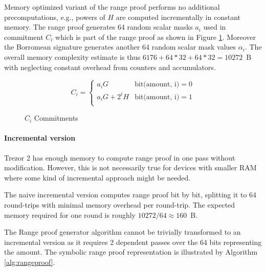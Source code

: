 \documentclass[]{article}
\begin{document}
Memory optimized variant of the range proof performs no additional precomputations, e.g., powers of $H$ are computed incrementally in constant memory. The range proof generates 64 random scalar masks $a_i$ used in commitment $C_i$ which is part of the range proof as shown in Figure \ref{eq:ci}. Moreover the Borromean signature generates another 64 random scalar mask values $\alpha_i$. The overall memory complexity estimate is thus $6176 + 64*32 + 64*32 = 10272$~B with neglecting constant overhead from counters and accumulators.  

\begin{figure}[H]
\begin{equation}
C_i = 
\begin{cases} 
a_iG & \text{bit(amount, i)} = 0 \\
a_iG + 2^iH & \text{bit(amount, i)} = 1 \\
\end{cases}
\end{equation}
\caption{$C_i$ Commitments} \label{eq:ci}
\end{figure}

\paragraph{Incremental version}
Trezor 2 has enough memory to compute range proof in one pass without modification. However, this is not necessarily true for devices with smaller RAM where some kind of incremental approach might be needed.

The naive incremental version computes range proof bit by bit, splitting it to 64 round-trips with minimal memory overhead per round-trip. The expected memory required for one round is roughly $10272 / 64 \approx 160$~B.

The Range proof generator algorithm cannot be trivially transformed to an incremental version as it requires 2 dependent passes over the 64 bits representing the amount. The symbolic range proof representation is illustrated by Algorithm \ref{alg:rangeproof}.
\end{document}
